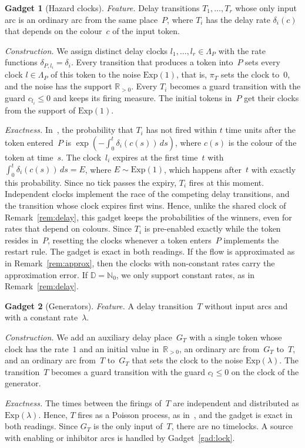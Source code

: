 \documentclass[11pt]{article}
\theoremstyle{definition}
\newcommand{\NatZero}{\mathbb{N}_0}
\newcommand{\Real}{\mathbb{R}}
\newcommand{\Dom}{\mathbb{D}}
\newtheorem{gadget}{Gadget}
\begin{document}
\begin{gadget}[Hazard clocks]\label{gad:hazard}
  \emph{Feature.} Delay transitions $T_1, \dots, T_r$ whose only input arc
  is an ordinary arc from the same place~$P$, where $T_i$ has the delay rate
  $\delta_i(c)$ that depends on the colour~$c$ of the input token.

  \emph{Construction.} We assign distinct delay clocks
  $l_1, \dots, l_r \in \Lambda_P$ with the rate functions
  $\delta_{P, l_i} = \delta_i$. Every transition that produces a token
  into~$P$ sets every clock $l \in \Lambda_P$ of this token to the noise
  $\mathrm{Exp}(1)$, that is, $\pi_T$ sets the clock to~$0$, and the noise
  has the support $\Real_{> 0}$. Every $T_i$ becomes a guard transition with
  the guard $c_{l_i} \le 0$ and keeps its firing measure. The initial tokens
  in~$P$ get their clocks from the support of $\mathrm{Exp}(1)$.

  \emph{Exactness.} In~\cite{EverdijBlom2005}, the probability that $T_i$ has
  not fired within $t$ time units after the token entered~$P$ is
  $\exp(-\int_0^t \delta_i(c(s))\, ds)$, where $c(s)$ is the colour of the
  token at time~$s$. The clock~$l_i$ expires at the first time~$t$ with
  $\int_0^t \delta_i(c(s))\, ds = E$, where $E \sim \mathrm{Exp}(1)$, which
  happens after~$t$ with exactly this probability. Since no tick passes the
  expiry, $T_i$ fires at this moment. Independent clocks implement the race
  of the competing delay transitions, and the transition whose clock expires
  first wins. Hence, unlike the shared clock of Remark~\ref{rem:delay}, this
  gadget keeps the probabilities of the winners, even for rates that depend
  on colours. Since $T_i$ is pre-enabled exactly while the token resides
  in~$P$, resetting the clocks whenever a token enters~$P$ implements the
  restart rule. The gadget is exact in both readings. If the flow is
  approximated as in Remark~\ref{rem:approx}, then the clocks with
  non-constant rates carry the approximation error. If $\Dom = \NatZero$, we
  only support constant rates, as in Remark~\ref{rem:delay}.
\end{gadget}

\begin{gadget}[Generators]\label{gad:gen}
  \emph{Feature.} A delay transition~$T$ without input arcs and with a
  constant rate~$\lambda$.

  \emph{Construction.} We add an auxiliary delay place~$G_T$ with a single
  token whose clock has the rate~$1$ and an initial value in~$\Real_{> 0}$,
  an ordinary arc from~$G_T$ to~$T$, and an ordinary arc from~$T$ to~$G_T$
  that sets the clock to the noise $\mathrm{Exp}(\lambda)$. The
  transition~$T$ becomes a guard transition with the guard $c_l \le 0$ on the
  clock of the generator.

  \emph{Exactness.} The times between the firings of~$T$ are independent and
  distributed as $\mathrm{Exp}(\lambda)$. Hence, $T$ fires as a Poisson
  process, as in~\cite{EverdijBlom2005}, and the gadget is exact in both
  readings. Since $G_T$ is the only input of~$T$, there are no timelocks. A
  source with enabling or inhibitor arcs is handled by Gadget~\ref{gad:lock}.
\end{gadget}
\end{document}
